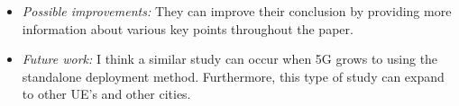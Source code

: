 \documentclass[letterpaper,twocolumn,10pt]{article}
\begin{document}
\begin{itemize}
\item {\it Possible improvements:} 
They can improve their conclusion by providing more information about various key points throughout the 
paper. 



\item {\it Future work:} 
I think a similar study can occur when 5G grows to using the standalone deployment method. Furthermore,
this type of study can expand to other UE's and other cities. 

\end{itemize}

{
  \small 
  
  
}
\end{document}
